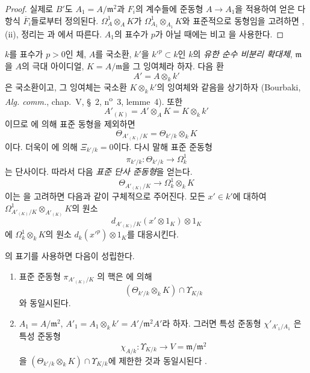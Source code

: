 \begin{proof}
실제로 $B'$도 $A_1=A/\mathfrak m^2$과 $F_i$의 계수들에 준동형
$A\longrightarrow A_1$을 적용하여 얻은 다항식 $\overline F_i$들로부터
정의된다. $\Omega^1_A\otimes_AK$가
$\Omega^1_{A_1}\otimes_{A_1}K$와 표준적으로 동형임을 고려하면
, (ii), 정리는 과
에서 따른다. $A_1$의 표수가 $p$가 아닐 때에는
비고 을 사용한다.
\end{proof}


\begin{env}[22.5.5]
\label{0.22.5.5-ko}
$k$를 표수가 $p>0$인 체, $A$를 국소환, $k'$을 $k'^p\subset k$인
$k$의 \emph{유한 순수 비분리 확대체}, $\mathfrak m$을 $A$의 극대
아이디얼, $K=A/\mathfrak m$을 그 잉여체라 하자. 다음 환
\[
  A'=A\otimes_kk'
\]
은 국소환이고, 그 잉여체는 국소환 $K\otimes_kk'$의 잉여체와 같음을
상기하자 (Bourbaki, \emph{Alg. comm.}, chap.~V, §~2,
n\textsuperscript{o}~3, lemme~4). 또한
\[
  A'_{(K)}=A'\otimes_AK=K\otimes_kk'
\]
이므로 에 의해 표준 동형을 제외하면
\begin{equation}
\label{0.22.5.5.1-ko}
  \Theta_{A'_{(K)}/K}=\Theta_{k'/k}\otimes_kK
  \tag{22.5.5.1}
\end{equation}
이다. 더욱이 에 의해 $\Xi_{k'/k}=0$이다. 다시 말해
표준 준동형 
\[
  \pi_{k'/k}:\Theta_{k'/k}\longrightarrow\Omega^1_k
\]
는 단사이다. 따라서 다음 \emph{표준 단사 준동형}을 얻는다.
\begin{equation}
\label{0.22.5.5.2-ko}
  \Theta_{A'_{(K)}/K}\longrightarrow\Omega^1_k\otimes_kK
  \tag{22.5.5.2}
\end{equation}
이는 을 고려하면 다음과 같이 구체적으로 주어진다.
모든 $x'\in k'$에 대하여
$\Omega^1_{A'_{(K)}/K}\otimes_{A'_{(K)}}K$의 원소
\[
  d_{A'_{(K)}/K}(x'\otimes1_K)\otimes1_K
\]
에 $\Omega^1_k\otimes_kK$의 원소 $d_k(x'^p)\otimes1_K$를 대응시킨다.
\end{env}

\begin{lemma}[22.5.6]
\label{0.22.5.6-ko}
의 표기를 사용하면 다음이 성립한다.
\begin{enumerate}
  \item[\rm(i)] 표준 준동형 $\pi_{A'_{(K)}/K}$
  의 핵은 에 의해
  \[
    (\Theta_{k'/k}\otimes_kK)\cap\Upsilon_{K/k}
  \]
  와 동일시된다.
  \item[\rm(ii)] $A_1=A/\mathfrak m^2$,
  $A'_1=A_1\otimes_kk'=A'/\mathfrak m^2A'$라 하자. 그러면 특성 준동형
  $\chi'_{A'_1/A_1}$ 은 특성 준동형
  \[
    \chi_{A/k}:\Upsilon_{K/k}\longrightarrow V=\mathfrak m/\mathfrak m^2
  \]
  을 $(\Theta_{k'/k}\otimes_kK)\cap\Upsilon_{K/k}$에 제한한 것과
  동일시된다 .
\end{enumerate}
\end{lemma}

